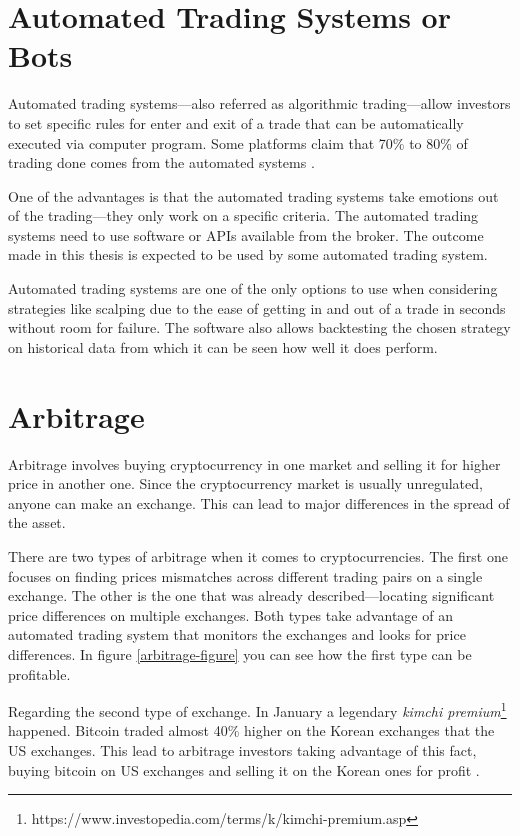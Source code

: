 \section{Automated Trading Systems or Bots}
\label{bots}
Automated trading systems---also referred as algorithmic trading---allow investors to set specific rules for enter and exit of a trade that can be automatically executed via computer program. Some platforms claim that 70\% to 80\% of trading done comes from the automated systems \cite{investopedia-bot-trading}.

One of the advantages is that the automated trading systems take emotions out of the trading---they only work on a specific criteria. The automated trading systems need to use software or APIs available from the broker. The outcome made in this thesis is expected to be used by some automated trading system.

Automated trading systems are one of the only options to use when considering strategies like scalping due to the ease of getting in and out of a trade in seconds without room for failure. The software also allows backtesting the chosen strategy on historical data from which it can be seen how well it does perform.

\section{Arbitrage}
Arbitrage involves buying cryptocurrency in one market and selling it for higher price in another one. Since the cryptocurrency market is usually unregulated, anyone can make an exchange. This can lead to major differences in the spread of the asset. 

There are two types of arbitrage when it comes to cryptocurrencies. The first one focuses on finding prices mismatches across different trading pairs on a single exchange. The other is the one that was already described---locating significant price differences on multiple exchanges. Both types take advantage of an automated trading system that monitors the exchanges and looks for price differences. In figure \ref{arbitrage-figure} you can see how the first type can be profitable.

Regarding the second type of exchange. In January a legendary \emph{kimchi premium}\footnote{https://www.investopedia.com/terms/k/kimchi-premium.asp} happened. Bitcoin traded almost 40\% higher on the Korean exchanges that the US exchanges. This lead to arbitrage investors taking advantage of this fact, buying bitcoin on US exchanges and selling it on the Korean ones for profit \cite{hodlbot:day-trading-cryptocurrency}.

